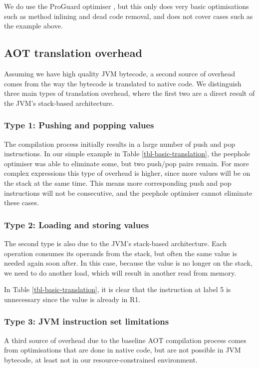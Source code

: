 We do use the ProGuard optimiser \cite{proguard}, but this only does very basic optimisations such as method inlining and dead code removal, and does not cover cases such as the example above.

\subsection{AOT translation overhead}
\label{sec-overhead-aot-translation}
Assuming we have high quality JVM bytecode, a second source of overhead comes from the way the bytecode is translated to native code. We distinguish three main types of translation overhead, where the first two are a direct result of the JVM's stack-based architecture.

\subsubsection{Type 1: Pushing and popping values} The compilation process initially results in a large number of push and pop instructions. In our simple example in Table \ref{tbl-basic-translation}, the peephole optimiser was able to eliminate some, but two push/pop pairs remain. For more complex expressions this type of overhead is higher, since more values will be on the stack at the same time. This means more corresponding push and pop instructions will not be consecutive, and the peephole optimiser cannot eliminate these cases.

\subsubsection{Type 2: Loading and storing values} The second type is also due to the JVM's stack-based architecture. Each operation consumes its operands from the stack, but often the same value is needed again soon after. In this case, because the value is no longer on the stack, we need to do another load, which will result in another read from memory.

In Table \ref{tbl-basic-translation}, it is clear that the  instruction at label 5 is unnecessary since the value is already in R1.

\subsubsection{Type 3: JVM instruction set limitations} A third source of overhead due to the baseline AOT compilation process comes from optimisations that are done in native code, but are not possible in JVM bytecode, at least not in our resource-constrained environment.

